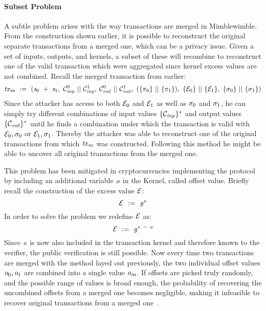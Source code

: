 \paragraph{Subset Problem} \label{par:pre:mimblewimble:subset}
A subtle problem arises with the way transactions are merged in Mimblewimble.
From the construction shown earlier, it is possible to reconstruct the original separate transactions from a merged one, which can be a privacy issue.
Given a set of inputs, outputs, and kernels, a subset of these will recombine to reconstruct one of the valid transaction which were aggregated since kernel excess values are not combined.
Recall the merged transaction from earlier:
\[ \mathit{tx}_m ~:=~ (\mathit{s}_0 ~+~ \mathit{s}_1 ,~ \mathcal{C}_{\mathit{inp}}^0 ~||~ \mathcal{C}_{\mathit{inp}}^1,\:\mathcal{C}_{\mathit{out}}^0 ~||~ \mathcal{C}_{\mathit{out}}^1 ,~ (\{\pi_0\} ~||~ \{\pi_1\}) ,~
\{\mathcal{E}_0\} ~||~ \{\mathcal{E}_1\} ,~ \{\sigma_0\} ~||~ \{\sigma_1\}) \]
Since the attacker has access to both $\mathcal{E}_0$ and $\mathcal{E}_1$ as well as $\sigma_0$ and $\sigma_1$, he can simply try different combinations of input values $\{\mathcal{C}_{\mathit{inp}}\}^*$ and output values $\{\mathcal{C}_{\mathit{out}}\}^*$ until he finds a combination under which the transaction is valid with $\mathcal{E}_0, \sigma_0$ or $\mathcal{E}_1, \sigma_1$.
Thereby the attacker was able to reconstruct one of the original transactions from which $\mathit{tx}_m$ was constructed.
Following this method he might be able to uncover all original transactions from the merged one.

This problem has been mitigated in cryptocurrencies implementing the protocol by including an additional variable $\mathit{o}$ in the Kernel, called offset value.
Briefly recall the construction of the excess value $\mathcal{E}$:
\[ \mathcal{E} ~:=~ \mathit{g}^{\mathit{e}} \]
In order to solve the problem we redefine $\mathcal{E}$ as:
\[ \mathcal{E} ~:=~ \mathit{g}^{\mathit{e} ~-~ \mathit{o}} \]
Since $\mathit{o}$ is now also included in the transaction kernel and therefore known to the verifier, the public verification is still possible.
Now every time two transactions are merged with the method layed out previously, the two individual offset values $\mathit{o}_0, \mathit{o}_1$ are combined into a single value $\mathit{o}_m$.
If offsets are picked truly randomly, and the possible range of values is broad enough, the probability of recovering the uncombined offsets from a merged one becomes negligible, making it infeasible to recover original transactions from a merged one~\cite{poelstra2016mimblewimble}.


